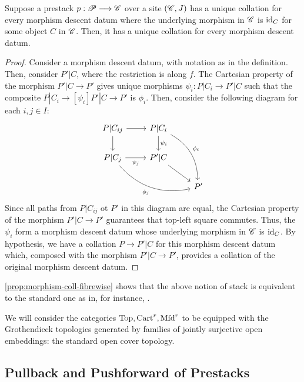 \documentclass[11pt]{amsart}
\begin{document}
\begin{prop}\label{prop:morphism-coll-fibrewise}
Suppose a prestack $p : \sP \to \sC$ over a site $(\mathscr{C}, J)$ has a unique collation for every
morphism descent datum where the underlying morphism in $\mathscr{C}$ is $\mathrm{id}_C$ for some object $C$
in $\mathscr{C}$. Then, it has a unique collation for every morphism descent datum.
\end{prop}
\begin{proof}
Consider a morphism descent datum, with notation as in the definition.
Then, consider $P'|C$, where the restriction is along $f$. The Cartesian property of the morphism
$P'|C \to P'$ gives unique morphisms $\psi_i : P|C_i \to P'|C$ such that the composite
$P|C_i \to[\psi_i] P'|C \to P'$ is $\phi_i$. Then, consider the following diagram for each
$i, j \in I$:
\[\begin{tikzcd}
P|C_{ij} \ar[r] \ar[d] & P|C_i \ar[d, "\psi_i"] \ar[rdd, bend left, "\phi_i" above right] & \\
P|C_j \ar[r, "\psi_j" below] \ar[rrd, bend right, "\phi_j" below left] &
P'|C \ar[rd] & \\
& & P'
\end{tikzcd}\]
Since all paths from $P|C_{ij}$ ot $P'$ in this diagram are equal, the Cartesian property
of the morphism $P'|C \to P'$ guarantees that top-left square commutes.
Thus, the $\psi_i$ form a morphism descent datum whose underlying morphism in $\mathscr{C}$ is $\mathrm{id}_C$.
By hypothesis, we have a collation $P \to P'|C$ for this morphism descent datum which, composed
with the morphism $P'|C \to P'$, provides a collation of the original morphism descent datum.
\end{proof}

\begin{rmk}\label{rmk:morphism-coll-fibrewise}
\cref{prop:morphism-coll-fibrewise} shows that the above notion of stack is equivalent
to the standard one as in, for instance, \cite[\S 2.5]{AlperModuli}.
\end{rmk}

\begin{conv}\label{conv:standard-topologies}
We will consider the categories $\mathrm{Top}, \mathrm{Cart}^r, \mathrm{Mfd}^r$ to be equipped with the Grothendieck
topologies generated by families of jointly surjective open embeddings: the standard open
cover topology.
\end{conv}

\subsection{Pullback and Pushforward of Prestacks}
\label{subsec:pullback-pushfwd-prest}
\end{document}
